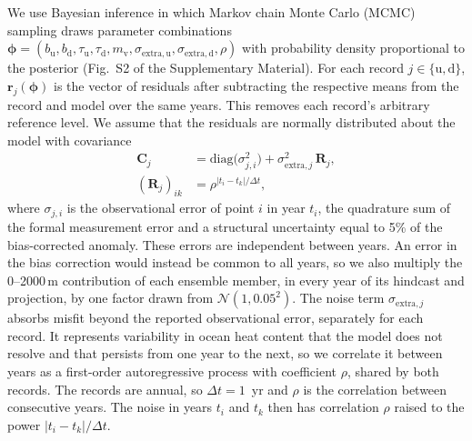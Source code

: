 \documentclass[draft,linenumbers]{agujournal2025}
\begin{document}
We use Bayesian inference \citep{Tarantola2005} in which Markov chain Monte Carlo (MCMC) sampling draws parameter combinations $\boldsymbol{\phi} = (b_{\mathrm{u}}, b_{\mathrm{d}}, \tau_{\mathrm{u}}, \tau_{\mathrm{d}}, m_{\mathrm{v}}, \sigma_{\mathrm{extra,u}}, \sigma_{\mathrm{extra,d}}, \rho)$ with probability density proportional to the posterior (Fig.~S2 of the Supplementary Material). For each record $j \in \{\mathrm{u}, \mathrm{d}\}$, $\mathbf{r}_j(\boldsymbol{\phi})$ is the vector of residuals after subtracting the respective means from the record and model over the same years. This removes each record's arbitrary reference level. We assume that the residuals are normally distributed about the model with covariance
      \begin{equation}
      \begin{aligned}
      \mathbf{C}_j &= \mathrm{diag}\bigl(\sigma_{j,i}^2\bigr) + \sigma_{\mathrm{extra},j}^2\,\mathbf{R}_j, \\
      (\mathbf{R}_j)_{ik} &= \rho^{|t_i - t_k|/\Delta t},
      \end{aligned}
      \label{eq:thermo_cov}
      \end{equation}
where $\sigma_{j,i}$ is the observational error of point $i$ in year $t_i$, the quadrature sum of the formal measurement error and a structural uncertainty equal to 5\% of the bias-corrected anomaly. These errors are independent between years. An error in the bias correction would instead be common to all years, so we also multiply the 0--2000\,m contribution of each ensemble member, in every year of its hindcast and projection, by one factor drawn from $\mathcal{N}(1, 0.05^2)$. The noise term $\sigma_{\mathrm{extra},j}$ absorbs misfit beyond the reported observational error, separately for each record. It represents variability in ocean heat content that the model does not resolve and that persists from one year to the next, so we correlate it between years as a first-order autoregressive process with coefficient $\rho$, shared by both records. The records are annual, so $\Delta t = 1$~yr and $\rho$ is the correlation between consecutive years. The noise in years $t_i$ and $t_k$ then has correlation $\rho$ raised to the power $|t_i - t_k|/\Delta t$.
\end{document}
